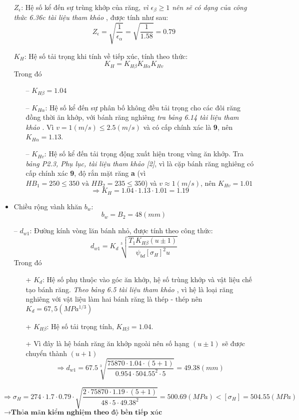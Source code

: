 \begin{itemize}
                \item[] $Z_\epsilon$: Hệ số kể đến sự trùng khớp của răng, \textit{vì $\epsilon_\beta \geq 1$ nên sẽ có dạng của công thức 6.36c tài liệu tham khảo \cite{tltk1}}, được tính như sau:
                    $$Z_{\epsilon} = \sqrt{\frac{1}{\epsilon_\alpha}} = \sqrt{\frac{1}{1.58}} = 0.79$$
                \item[] $K_H$: Hệ số tải trọng khi tính về tiếp xúc, tính theo thức:
                    $$K_H = K_{H\beta}K_{H\alpha}K_{Hv}$$
                Trong đó
                \begin{itemize}
                    \item[--] $K_{H\beta} = 1.04$
                    \item[--] $K_{H\alpha}$: Hệ số kể đến sự phân bố không đều tải trọng cho các đôi răng đồng thời ăn khớp, với bánh răng nghiêng \textit{tra bảng 6.14 tài liệu tham khảo \cite{tltk1}}. Vì $v = 1 (m/s) \leq 2.5 (m/s)$ và có cấp chính xác là \textbf{9}, nên $K_{H\alpha} = 1.13$.
                    \item[--] $K_{Hv}$: Hệ số kể đến tải trọng động xuất hiện trong vùng ăn khớp. Tra \textit{bảng P2.3, Phụ lục, tài liệu tham khảo [2]}, vì là cặp bánh răng nghiêng có cấp chính xác \textbf{9}, độ rắn mặt răng \textbf{a} (vì $HB_1 = 250 \leq 350 \text{ và } HB_2 = 235 \leq 350$) và $v \approx 1 (m/s)$, nên $K_{Hv} = 1.01$
                    $$\Rightarrow K_H = 1.04 \cdot 1.13 \cdot 1.01 = 1.19$$
                \end{itemize}
                \item Chiều rộng vành khăn $b_w$:
                    $$b_w = B_{2} = 48 (mm)$$
                \item[--] $d_{w1}$: Đường kính vòng lăn bánh nhỏ, được tính theo công thức:
                    $$d_{w1} = K_d\sqrt[3]{\frac{T_1K_{H\beta}(u \pm 1)}{\psi_{bd}[\sigma_H]^2u}}$$
                    Trong đó
                    \begin{itemize}
                        \item[+] $K_d$: Hệ số phụ thuộc vào góc ăn khớp, hệ số trùng khớp và vật liệu chế tạo bánh răng. \textit{Theo bảng 6.5 tài liệu tham khảo \cite{tltk1}}, vì hệ là loại răng nghiêng với vật liệu làm hai bánh răng là thép - thép nên $K_d = 67,5 (MPa^{1/3})$
                        \item[+] $K_{H\beta}$: Hệ số tải trọng tính, $K_{H\beta} = 1.04$.
                        \item[+] Vì đây là hệ bánh răng ăn khớp ngoài nên số hạng $(u \pm 1)$ sẽ được chuyển thành $(u + 1)$ 
                        $$\Rightarrow d_{w1} = 67.5\sqrt[3]{\frac{75870 \cdot 1.04 \cdot (5 + 1)}{0.954 \cdot 504.55^2 \cdot 5}} = 49.38 (mm)$$
                    \end{itemize} 
            \end{itemize}
        $$\Rightarrow \sigma_H = 274 \cdot 1.7 \cdot 0.79 \cdot\sqrt{\frac{2 \cdot 75870 \cdot 1.19 \cdot (5 + 1)}{48 \cdot 5 \cdot 49.38^2}} = 500.69 (MPa) < [\sigma_H] = 504.55 (MPa)$$
        $\rightarrow \textbf{Thỏa mãn kiểm nghiệm theo độ bền tiếp xúc}$
